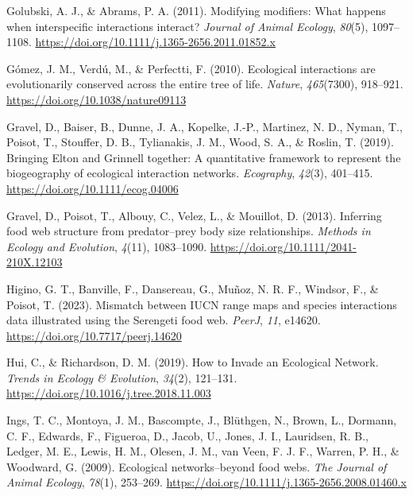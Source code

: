 \documentclass[
]{article}
\newlength{\cslhangindent}
\newenvironment{CSLReferences}[2] %
 {\begin{list}{}{%
  \setlength{\itemindent}{0pt}
  \setlength{\leftmargin}{0pt}
  \setlength{\parsep}{0pt}
  \ifodd #1
   \setlength{\leftmargin}{\cslhangindent}
   \setlength{\itemindent}{-1\cslhangindent}
  \fi
  \setlength{\itemsep}{#2\baselineskip}}}
 {\end{list}}
\begin{document}
\begin{CSLReferences}{1}{0}
Golubski, A. J., \& Abrams, P. A. (2011). Modifying modifiers: What
happens when interspecific interactions interact? \emph{Journal of
Animal Ecology}, \emph{80}(5), 1097--1108.
\url{https://doi.org/10.1111/j.1365-2656.2011.01852.x}

Gómez, J. M., Verdú, M., \& Perfectti, F. (2010). Ecological
interactions are evolutionarily conserved across the entire tree of
life. \emph{Nature}, \emph{465}(7300), 918--921.
\url{https://doi.org/10.1038/nature09113}

Gravel, D., Baiser, B., Dunne, J. A., Kopelke, J.-P., Martinez, N. D.,
Nyman, T., Poisot, T., Stouffer, D. B., Tylianakis, J. M., Wood, S. A.,
\& Roslin, T. (2019). Bringing {Elton} and {Grinnell} together: A
quantitative framework to represent the biogeography of ecological
interaction networks. \emph{Ecography}, \emph{42}(3), 401--415.
\url{https://doi.org/10.1111/ecog.04006}

Gravel, D., Poisot, T., Albouy, C., Velez, L., \& Mouillot, D. (2013).
Inferring food web structure from predator--prey body size
relationships. \emph{Methods in Ecology and Evolution}, \emph{4}(11),
1083--1090. \url{https://doi.org/10.1111/2041-210X.12103}

Higino, G. T., Banville, F., Dansereau, G., Muñoz, N. R. F., Windsor,
F., \& Poisot, T. (2023). Mismatch between {IUCN} range maps and species
interactions data illustrated using the {Serengeti} food web.
\emph{PeerJ}, \emph{11}, e14620.
\url{https://doi.org/10.7717/peerj.14620}

Hui, C., \& Richardson, D. M. (2019). How to {Invade} an {Ecological
Network}. \emph{Trends in Ecology \& Evolution}, \emph{34}(2), 121--131.
\url{https://doi.org/10.1016/j.tree.2018.11.003}

Ings, T. C., Montoya, J. M., Bascompte, J., Blüthgen, N., Brown, L.,
Dormann, C. F., Edwards, F., Figueroa, D., Jacob, U., Jones, J. I.,
Lauridsen, R. B., Ledger, M. E., Lewis, H. M., Olesen, J. M., van Veen,
F. J. F., Warren, P. H., \& Woodward, G. (2009). Ecological
networks--beyond food webs. \emph{The Journal of Animal Ecology},
\emph{78}(1), 253--269.
\url{https://doi.org/10.1111/j.1365-2656.2008.01460.x}


\end{CSLReferences}
\end{document}
